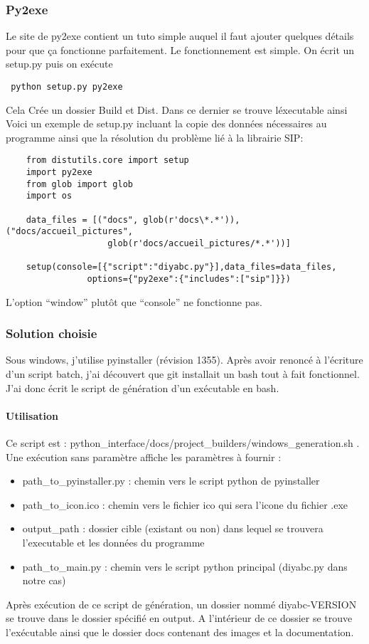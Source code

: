 \documentclass[12pt,a4paper]{article}
\begin{document}
        \subsubsection{Py2exe}
        Le site de py2exe contient un tuto simple auquel il faut ajouter quelques d\'etails pour que ça fonctionne parfaitement. Le
        fonctionnement est simple. On \'ecrit un setup.py puis on ex\'ecute \begin{verbatim} python setup.py py2exe \end{verbatim} Cela Cr\'ee un dossier 
        Build et Dist. Dans ce dernier se trouve l\'executable ainsi
        Voici un exemple de setup.py incluant la copie des donn\'ees n\'ecessaires au programme ainsi que la r\'esolution du problème
        li\'e à la librairie SIP:
        \begin{verbatim}
    from distutils.core import setup
    import py2exe
    from glob import glob
    import os

    data_files = [("docs", glob(r'docs\*.*')),("docs/accueil_pictures",
                    glob(r'docs/accueil_pictures/*.*'))]

    setup(console=[{"script":"diyabc.py"}],data_files=data_files, 
                options={"py2exe":{"includes":["sip"]}})
        \end{verbatim}
        L'option ``window'' plutôt que ``console'' ne fonctionne pas.
        \subsubsection{Solution choisie}
        Sous windows, j'utilise pyinstaller (révision 1355). Après avoir renoncé à l'écriture d'un script batch,
        j'ai découvert que git installait un bash tout à fait fonctionnel. J'ai donc écrit le script de génération 
        d'un exécutable en bash.
        \paragraph{Utilisation}

        Ce script est : python\_interface/docs/project\_builders/windows\_generation.sh . Une 
        exécution sans paramètre affiche les paramètres à fournir : \\
        \begin{itemize}
            \item path\_to\_pyinstaller.py : chemin vers le script python de pyinstaller
            \item path\_to\_icon.ico : chemin vers le fichier ico qui sera l'icone du fichier .exe
            \item output\_path : dossier cible (existant ou non) dans lequel se trouvera l'executable et les données du programme
            \item path\_to\_main.py : chemin vers le script python principal (diyabc.py dans notre cas)\\
        \end{itemize}
        Après exécution de ce script de génération, un dossier nommé diyabc-VERSION se trouve dans le dossier 
        spécifié en output. A l'intérieur de ce dossier se trouve l'exécutable ainsi que le dossier docs contenant des images et la documentation.
\end{document}
